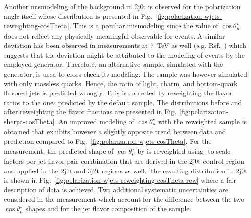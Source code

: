Another mismodeling of the \wjets background in 2j0t is observed for the polarization angle itself whose distribution is presented in Fig.~\ref{fig:polarization-wjets-reweighting-cosTheta}. This is a peculiar mismodeling since the value of $\cos\theta_\mu^\star$ does not reflect any physically meaningful observable for \wjets events. A similar deviation has been observed in measurements at 7~TeV as well (e.g. Ref.~\cite{Komm-thesis}) which suggests that the deviation might be attributed to the modeling of \wjets events by the employed \MG generator. Therefore, an alternative \wjets sample, simulated with the \SHERPA generator, is used to cross check its modeling. The sample was however simulated with only massless quarks. Hence, the ratio of light, charm, and bottom-quark flavored jets is predicted wrongly. This is corrected by reweighting the flavor ratios to the ones predicted by the default \MG sample. The distributions before and after reweighting the flavor fractions are presented in Fig.~\ref{fig:polarization-sherpa-cosTheta}. An improved modeling of $\cos\theta_{\mu}^\star$ with the reweighted \SHERPA sample is obtained that exhibits however a slightly opposite trend between data and prediction compared to Fig.~\ref{fig:polarization-wjets-cosTheta}. For the measurement, the predicted shape of $\cos\theta_{\mu}^\star$ by \MG is reweighted using \MG-to-\SHERPA scale factors per jet flavor pair combination that are derived in the 2j0t control region and applied in the 2j1t and 3j2t regions as well. The resulting distribution in 2j0t is shown in Fig.~\ref{fig:polarization-wjets-reweighting-cosTheta-rew} where a fair description of data is achieved. Two additional systematic uncertainties are considered in the measurement which account for the difference between the two $\cos\theta_\mu^\star$ shapes and for the jet flavor composition of the \wjets sample.




